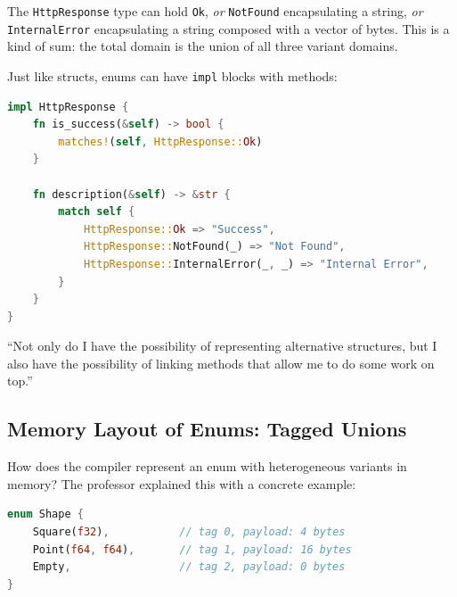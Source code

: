 The \texttt{HttpResponse} type can hold \texttt{Ok}, \textit{or} \texttt{NotFound} encapsulating a string, \textit{or} \texttt{InternalError} encapsulating a string composed with a vector of bytes. This is a kind of sum: the total domain is the union of all three variant domains.

\begin{insightbox}
Just like structs, enums can have \texttt{impl} blocks with methods:
\begin{lstlisting}[language=Rust]
impl HttpResponse {
    fn is_success(&self) -> bool {
        matches!(self, HttpResponse::Ok)
    }

    fn description(&self) -> &str {
        match self {
            HttpResponse::Ok => "Success",
            HttpResponse::NotFound(_) => "Not Found",
            HttpResponse::InternalError(_, _) => "Internal Error",
        }
    }
}
\end{lstlisting}
``Not only do I have the possibility of representing alternative structures, but I also have the possibility of linking methods that allow me to do some work on top.''
\end{insightbox}

\subsection{Memory Layout of Enums: Tagged Unions}

How does the compiler represent an enum with heterogeneous variants in memory? The professor explained this with a concrete example:

\begin{lstlisting}[language=Rust]
enum Shape {
    Square(f32),           // tag 0, payload: 4 bytes
    Point(f64, f64),       // tag 1, payload: 16 bytes
    Empty,                 // tag 2, payload: 0 bytes
}
\end{lstlisting}

